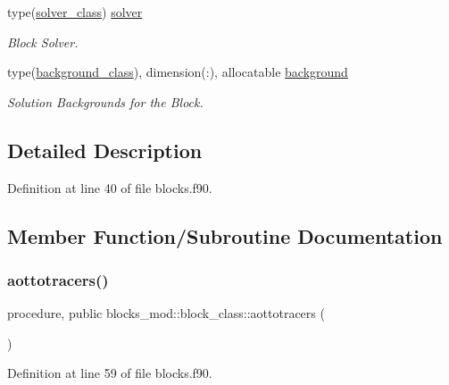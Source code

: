 \begin{DoxyCompactItemize}
type(\mbox{\hyperlink{structsolver__mod_1_1solver__class}{solver\+\_\+class}}) \mbox{\hyperlink{structblocks__mod_1_1block__class_a081258113128b3bcdefdbeac4bc5d039}{solver}}
\begin{DoxyCompactList}\small\item\em Block Solver. \end{DoxyCompactList}\item 
type(\mbox{\hyperlink{structbackground__mod_1_1background__class}{background\+\_\+class}}), dimension(\+:), allocatable \mbox{\hyperlink{structblocks__mod_1_1block__class_a774c07bf82d1392236abc81c285ea943}{background}}
\begin{DoxyCompactList}\small\item\em Solution Backgrounds for the Block. \end{DoxyCompactList}\end{DoxyCompactItemize}


\subsection{Detailed Description}


Definition at line 40 of file blocks.\+f90.



\subsection{Member Function/\+Subroutine Documentation}
\mbox{\label{structblocks__mod_1_1block__class_af7ee4536d72f1a114d9289c9e484f703}} 
\subsubsection{\texorpdfstring{aottotracers()}{aottotracers()}}
{\footnotesize\ttfamily procedure, public blocks\+\_\+mod\+::block\+\_\+class\+::aottotracers (\begin{DoxyParamCaption}{ }\end{DoxyParamCaption})}



Definition at line 59 of file blocks.\+f90.

\mbox{\label{structblocks__mod_1_1block__class_ad1d0f1aca1323fad86177deb0b818a51}} 
